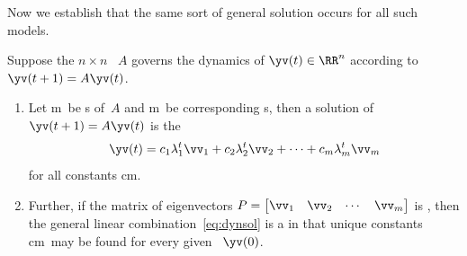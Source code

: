 Now we establish that the same sort of general solution occurs for all such models.


\begin{theorem} \label{thm:dynsol}
Suppose the \(n\times n\) ~\(A\) governs the dynamics of \(\yv(t)\in\RR^n\) according to \(\yv(t+1)=A\yv(t)\).
\begin{enumerate}
\item\label{thm:dynsola} Let \hlist\lambda m\ be s of~\(A\) and \hlist\vv m\ be corresponding s, then a solution of \(\yv(t+1)=A\yv(t)\) is the 
\begin{equation}
\yv(t)=c_1\lambda_1^t\vv_1+c_2\lambda_2^t\vv_2+\cdots+c_m\lambda_m^t\vv_m
\label{eq:dynsol}
\end{equation}
for all constants \hlist cm.

\sloppy
\item\label{thm:dynsolb} Further, if 
the matrix of eigenvectors \(P=\begin{bmatrix} \vv_1&\vv_2&\cdots&\vv_m \end{bmatrix}\) is , then the general linear combination~\eqref{eq:dynsol} is a  in that unique constants \hlist cm\ may be found for every given ~\(\yv(0)\).
\end{enumerate}
\end{theorem}

